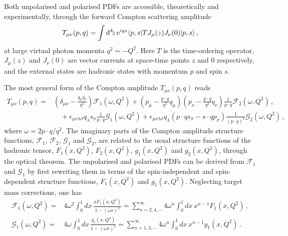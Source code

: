 Both unpolarised and polarised PDFs are accessible, theoretically and 
experimentally, through the forward Compton scattering amplitude
\begin{equation}
\label{eq:Compton}
T_{\mu\nu}(p,q) 
= 
\int {\rm d}^4\!z\, {\rm e}^{iqz}  \langle p,s |T J_\mu(z) J_\nu(0)|p,s\rangle\, ,
\end{equation}
at large virtual photon momenta $q^2=-Q^2$. 
%
Here $T$ is the time-ordering operator, $J_\mu(z)$ and $J_\nu(0)$ are vector
currents at space-time points $z$ and $0$ respectively, and the 
external states are hadronic states with momentum $p$ and spin $s$.

The most general form of the Compton amplitude $T_{\mu\nu}(p,q)$ reads
\begin{align}
T_{\mu\nu}(p,q) 
= {} & 
  \left(\delta_{\mu\nu}-\frac{q_\mu q_\nu}{q^2}\right)\mathcal{F}_1(\omega,Q^2) 
+ \left(p_\mu-\frac{p\cdot q}{q^2}q_\mu\right) \left(p_\nu-\frac{p\cdot q}{q^2}q_\nu\right) \frac{1}{p\cdot q} \mathcal{F}_2(\omega,Q^2)\,,
\nonumber\\ 
& {} \quad  
+ \epsilon_{\mu\nu\lambda\sigma}q_\lambda s_\sigma \frac{1}{p\cdot q}\mathcal{G}_1(\omega,Q^2)
+ \epsilon_{\mu\nu\lambda\sigma}q_\lambda \left(p\cdot q s_\sigma - s\cdot q p_\sigma\right) \frac{1}{(p\cdot q)^2}\mathcal{G}_2(\omega,Q^2)\,,
\end{align}
where $\omega=2p\cdot q/q^2$.
%
The imaginary parts of the Compton amplitude structure functions, 
$\mathcal{F}_1$, $\mathcal{F}_2$, $\mathcal{G}_1$ and $\mathcal{G}_2$, 
are related to the usual structure functions of the hadronic tensor, 
$F_1(x,Q^2)$, $F_2(x,Q^2)$, $g_1(x,Q^2)$ and $g_2(x,Q^2)$, 
through the optical theorem.
%
The unpolarised and polarised PDFs can be derived from $\mathcal{F}_1$ and 
$\mathcal{G}_1$ by first rewriting them in terms of the spin-independent 
and spin-dependent structure functions, $F_1(x,Q^2)$ and $g_1(x,Q^2)$.
%
Neglecting target mass corrections, one has
\begin{align}
\mathcal{F}_1(\omega,Q^2) 
= {} & 4 \omega^2 \int_0^1 dx\,  \frac{xF_1(x,Q^2)}{1-(\omega x)^2} 
= \sum_{n=2,4,\cdots}^\infty 4\omega^n \int_0^1 dx\, x^{n-1} F_1(x,Q^2) \,, \\
\mathcal{G}_1(\omega,Q^2) 
= {} & 4 \omega \int_0^1 dx\, \frac{g_1(x,Q^2)}{1-(\omega x)^2} 
= \sum_{n=1,3,\cdots}^\infty 4\omega^n \int_0^1 dx\, x^{n-1} g_1(x,Q^2)\,.
\end{align}

